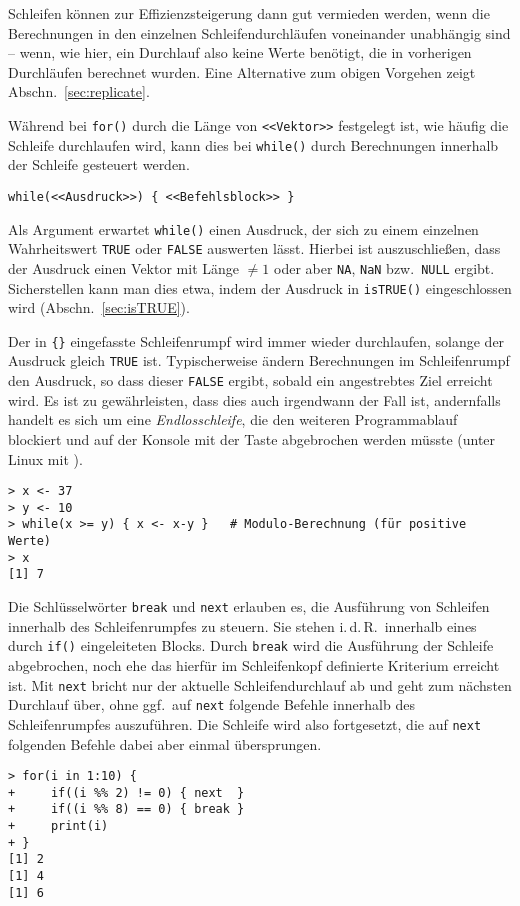 Schleifen können zur Effizienzsteigerung dann gut vermieden werden, wenn die Berechnungen in den einzelnen Schleifendurchläufen voneinander unabhängig sind -- wenn, wie hier, ein Durchlauf also keine Werte benötigt, die in vorherigen Durchläufen berechnet wurden. Eine Alternative zum obigen Vorgehen zeigt Abschn.\ \ref{sec:replicate}.

Während bei \lstinline!for()! durch die Länge von \lstinline!<<Vektor>>! festgelegt ist, wie häufig die Schleife durchlaufen wird, kann dies bei \lstinline!while()! durch Berechnungen innerhalb der Schleife gesteuert werden.
\begin{lstlisting}
while(<<Ausdruck>>) { <<Befehlsblock>> }
\end{lstlisting}

Als Argument erwartet \lstinline!while()! einen Ausdruck, der sich zu einem einzelnen Wahrheitswert \lstinline!TRUE! oder \lstinline!FALSE! auswerten lässt. Hierbei ist auszuschließen, dass der Ausdruck einen Vektor mit Länge $\neq 1$ oder aber \lstinline!NA!, \lstinline!NaN! bzw.\ \lstinline!NULL! ergibt. Sicherstellen kann man dies etwa, indem der Ausdruck in \lstinline!isTRUE()! eingeschlossen wird (Abschn.\ \ref{sec:isTRUE}).

Der in \lstinline!{}! eingefasste Schleifenrumpf wird immer wieder durchlaufen, solange der Ausdruck gleich \lstinline!TRUE! ist. Typischerweise ändern Berechnungen im Schleifenrumpf den Ausdruck, so dass dieser \lstinline!FALSE! ergibt, sobald ein angestrebtes Ziel erreicht wird. Es ist zu gewährleisten, dass dies auch irgendwann der Fall ist, andernfalls handelt es sich um eine \emph{Endlosschleife}, die den weiteren Programmablauf blockiert und auf der Konsole mit der  Taste abgebrochen werden müsste (unter Linux mit ).
\begin{lstlisting}
> x <- 37
> y <- 10
> while(x >= y) { x <- x-y }   # Modulo-Berechnung (für positive Werte)
> x
[1] 7
\end{lstlisting}

Die Schlüsselwörter \lstinline!break! und \lstinline!next! erlauben es, die Ausführung von Schleifen innerhalb des Schleifenrumpfes zu steuern. Sie stehen i.\,d.\,R.\ innerhalb eines durch \lstinline!if()! eingeleiteten Blocks. Durch \lstinline!break! wird die Ausführung der Schleife abgebrochen, noch ehe das hierfür im Schleifenkopf definierte Kriterium erreicht ist. Mit \lstinline!next! bricht nur der aktuelle Schleifendurchlauf ab und geht zum nächsten Durchlauf über, ohne ggf.\ auf \lstinline!next! folgende Befehle innerhalb des Schleifenrumpfes auszuführen. Die Schleife wird also fortgesetzt, die auf \lstinline!next! folgenden Befehle dabei aber einmal übersprungen.
\begin{lstlisting}
> for(i in 1:10) {
+     if((i %% 2) != 0) { next  }
+     if((i %% 8) == 0) { break }
+     print(i)
+ }
[1] 2
[1] 4
[1] 6
\end{lstlisting}

